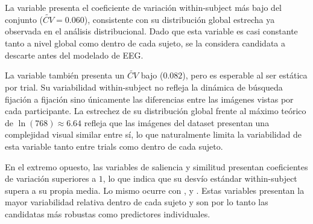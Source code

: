 La variable  presenta el coeficiente de variación within-subject más bajo del conjunto ($\widetilde{CV} = 0.060$), consistente
con su distribución global estrecha ya observada en el análisis distribucional. Dado que esta variable es casi
constante tanto a nivel global como dentro de cada sujeto, se la considera
candidata a descarte antes del modelado de EEG. %

La variable  también presenta un
$\widetilde{CV}$ bajo ($0.082$), pero es esperable al ser
estática por trial. Su variabilidad within-subject no refleja la dinámica 
de búsqueda fijación a fijación sino únicamente las diferencias entre las 
imágenes vistas por cada participante. La estrechez de su distribución global
frente al máximo teórico de $\ln(768) \approx 6.64$ refleja que las 
imágenes del dataset presentan una complejidad visual similar entre sí, 
lo que naturalmente limita la variabilidad de esta variable tanto entre 
trials como dentro de cada sujeto.

En el extremo opuesto, las variables de saliencia y similitud presentan 
coeficientes de variación superiores a $1$, lo que indica que su desvío 
estándar within-subject supera a su propia media. Lo mismo ocurre con 
, 
 y 
. Estas variables 
presentan la mayor variabilidad relativa dentro de cada sujeto y son 
por lo tanto las candidatas más robustas como predictores individuales.

%
